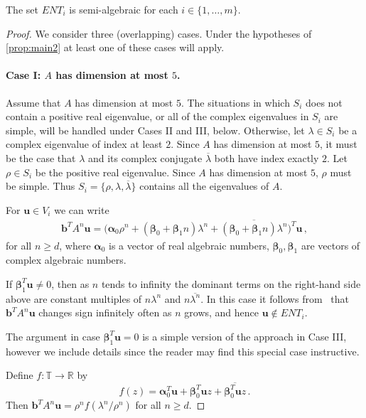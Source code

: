 \begin{proposition}
The set $\mathit{ENT}_i$ is semi-algebraic for each $i\in \{1,\ldots,m\}$.
\label{prop:semi-alg}
\end{proposition}
\begin{proof}
  We consider three (overlapping) cases.  Under the hypotheses of
  \cref{prop:main2} at least one of these cases will apply.

\paragraph{Case I: $A$ has dimension at most $5$.}
Assume that $A$ has dimension at most $5$.  The situations in which
$S_i$ does not contain a positive real eigenvalue, or
all of the complex eigenvalues in $S_i$ are simple, will be handled
under Cases II and III, below.  Otherwise, let $\lambda\in S_i$ be a complex
eigenvalue of index at least $2$.  Since $A$ has dimension at most
$5$, it must be the case that $\lambda$ and its complex conjugate
$\overline{\lambda}$ both have index exactly $2$.  Let $\rho \in S_i$
be the positive real eigenvalue.  Since
$A$ has dimension at most $5$, $\rho$ must be simple.  Thus
$S_i=\{\rho,\lambda,\overline{\lambda}\}$ contains all the eigenvalues
of $A$.

For $\boldsymbol{u}\in V_i$ we can write
\begin{align*}
\boldsymbol{b}^TA^n\boldsymbol{u} =
\big(\boldsymbol{\alpha}_0\rho^n  + (\boldsymbol{\beta}_0+ \boldsymbol{\beta}_1n)\lambda^n
 + \overline{(\boldsymbol{\beta}_0+\boldsymbol{\beta}_1n)
\lambda^n}\big)^T\boldsymbol{u} \, ,
\label{eq:small}
\end{align*}
for all $n\geq d$,
where $\boldsymbol{\alpha}_0$ is a vector of real algebraic numbers,
$\boldsymbol{\beta}_0,\boldsymbol{\beta}_1$ are vectors of complex
algebraic numbers.

If $\boldsymbol{\beta}_1^T\boldsymbol{u}\neq 0$, then as $n$ tends to
infinity the dominant terms on the right-hand side above are constant
multiples of $n\lambda^n$ and $n\overline{\lambda^n}$.  In this case
it follows from~\cite[Lemma 4]{Bra06} that
$\boldsymbol{b}^TA^n\boldsymbol{u}$ changes sign infinitely often as
$n$ grows, and hence $\boldsymbol{u}\not\in\mathit{ENT}_i$.

The argument in case $\boldsymbol{\beta}_1^T\boldsymbol{u}=0$ is a
simple version of the approach in Case III, however we include details
since the reader may find this special case instructive.

Define $f:\mathbb{T}\rightarrow\mathbb{R}$ by
\[ f(z)=\boldsymbol{\alpha}_0^T\boldsymbol{u}+
\boldsymbol{\beta}_0^T\boldsymbol{u}z+
\overline{\boldsymbol{\beta}_0^T\boldsymbol{u}z} \, .\]
Then $\boldsymbol{b}^TA^n\boldsymbol{u} = \rho^n f(\lambda^n/\rho^n)$ for all $n\geq d$.


\end{proof}
